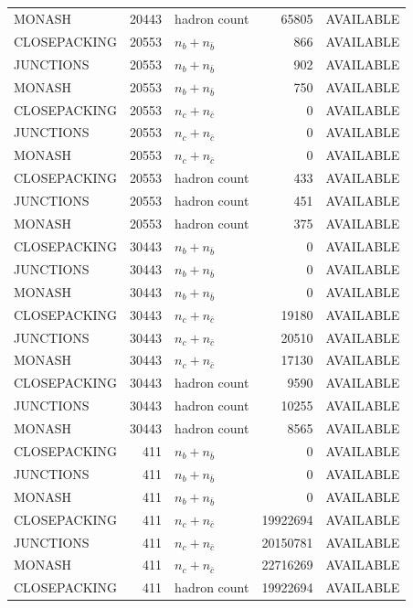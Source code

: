 \begin{landscape}
\begin{longtable}{@{}lrlrl@{}}
MONASH & 20443 & hadron count & \num{65805} & AVAILABLE \\
CLOSEPACKING & 20553 & $n_b+n_{\bar b}$ & \num{866} & AVAILABLE \\
JUNCTIONS & 20553 & $n_b+n_{\bar b}$ & \num{902} & AVAILABLE \\
MONASH & 20553 & $n_b+n_{\bar b}$ & \num{750} & AVAILABLE \\
CLOSEPACKING & 20553 & $n_c+n_{\bar c}$ & \num{0} & AVAILABLE \\
JUNCTIONS & 20553 & $n_c+n_{\bar c}$ & \num{0} & AVAILABLE \\
MONASH & 20553 & $n_c+n_{\bar c}$ & \num{0} & AVAILABLE \\
CLOSEPACKING & 20553 & hadron count & \num{433} & AVAILABLE \\
JUNCTIONS & 20553 & hadron count & \num{451} & AVAILABLE \\
MONASH & 20553 & hadron count & \num{375} & AVAILABLE \\
CLOSEPACKING & 30443 & $n_b+n_{\bar b}$ & \num{0} & AVAILABLE \\
JUNCTIONS & 30443 & $n_b+n_{\bar b}$ & \num{0} & AVAILABLE \\
MONASH & 30443 & $n_b+n_{\bar b}$ & \num{0} & AVAILABLE \\
CLOSEPACKING & 30443 & $n_c+n_{\bar c}$ & \num{19180} & AVAILABLE \\
JUNCTIONS & 30443 & $n_c+n_{\bar c}$ & \num{20510} & AVAILABLE \\
MONASH & 30443 & $n_c+n_{\bar c}$ & \num{17130} & AVAILABLE \\
CLOSEPACKING & 30443 & hadron count & \num{9590} & AVAILABLE \\
JUNCTIONS & 30443 & hadron count & \num{10255} & AVAILABLE \\
MONASH & 30443 & hadron count & \num{8565} & AVAILABLE \\
CLOSEPACKING & 411 & $n_b+n_{\bar b}$ & \num{0} & AVAILABLE \\
JUNCTIONS & 411 & $n_b+n_{\bar b}$ & \num{0} & AVAILABLE \\
MONASH & 411 & $n_b+n_{\bar b}$ & \num{0} & AVAILABLE \\
CLOSEPACKING & 411 & $n_c+n_{\bar c}$ & \num{19922694} & AVAILABLE \\
JUNCTIONS & 411 & $n_c+n_{\bar c}$ & \num{20150781} & AVAILABLE \\
MONASH & 411 & $n_c+n_{\bar c}$ & \num{22716269} & AVAILABLE \\
CLOSEPACKING & 411 & hadron count & \num{19922694} & AVAILABLE \\

\end{longtable}
\end{landscape}
